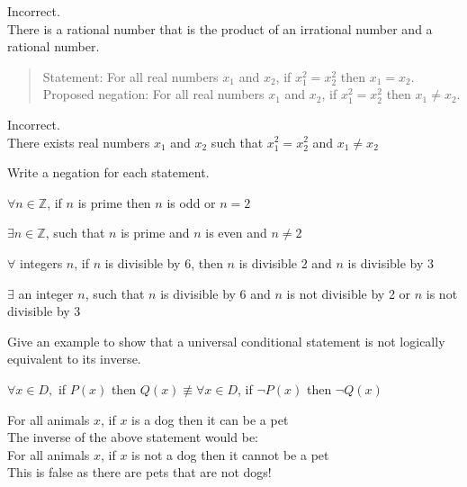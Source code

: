 \documentclass[12pt,letterpaper, onecolumn]{exam}
\begin{document}
\begin{questions}
		\begin{solution}
			Incorrect.\\
			There is a rational number that is the product of an irrational number and a rational number.
		\end{solution}
		\setcounter{question}{13}\question \begin{quote}
			Statement: For all real numbers $x_1$ and $x_2$, if $x_1^2=x_2^2$ then $x_1=x_2$.\\
			Proposed negation: For all real numbers $x_1$ and $x_2$, if  $x_1^2=x_2^2$ then $x_1\neq x_2$.
		\end{quote}
		\begin{solution}
			Incorrect.\\
			There exists real numbers $x_1$ and $x_2$ such that $x_1^2 = x_2^2$ and $x_1 \neq x_2$
		\end{solution}
		\begin{center}
			Write a negation for each statement.
		\end{center}
		\setcounter{question}{18}\question  $\forall n \in \mathbb{Z}$, if $n$ is prime then $n$ is odd or $n=2$
		\begin{solution}
			$\exists n \in \mathbb{Z}$, such that $n$ is prime and $n$ is even and $n \neq 2$
		\end{solution}
		\setcounter{question}{20}\question $\forall$ integers $n$, if $n$ is divisible by 6, then $n$ is divisible 2 and $n$ is divisible by 3
		\begin{solution}
			$\exists$ an integer $n$, such that $n$ is divisible by 6 and $n$ is not divisible by 2 or $n$ is not divisible by 3 
		\end{solution}
		
		
		\setcounter{question}{34}\question Give an example to show that a universal conditional statement is not logically equivalent to its inverse.
		
		\begin{solution}
			\begin{center}
				$\forall x \in D,$ if $P(x)$ then $Q(x) \not\equiv \forall x \in D$, if $\neg P(x)$ then $\neg Q(x)$
			\end{center}
			For all animals $x$, if $x$ is a dog then it can be a pet\\
			The inverse of the above statement would be:\\
			For all animals $x$, if $x$ is not a dog then it cannot be a pet\\
			This is false as there are pets that are not dogs!
		\end{solution}
		

\end{questions}
\end{document}
